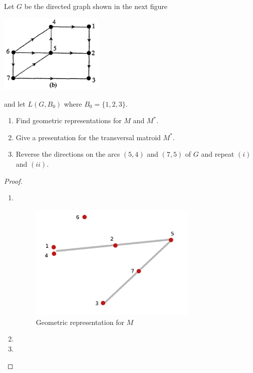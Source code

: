 \prob
{
    Let $G$ be the directed graph shown in the next figure 
		    \begin{center}
                \includegraphics[width=5cm]{Test2/Problem13/Figure2_17.png}
            \end{center}\pn
		and let $L(G, B_0)$ where $B_0 = \{1,2,3\}$. 
    \begin{enumerate}[label=(\roman*)]
        \item   Find geometric representations for $M$ and $M^*$.
        \item   Give a presentation for the transversal matroid $M^*$.
        \item   Reverse the directions on the arcs $(5,4)$ and $(7,5)$ of $G$
                and repeat $(i)$ and $(ii)$.
    \end{enumerate}
}
\begin{proof}
    \begin{enumerate}
        \item $\,$\pn
             \begin{figure}[H]
                \begin{center}
                    \includegraphics[width=8cm]{Test2/Problem13/GraphicRepresentationM.png}
                \end{center}                            
                \caption{Geometric representation for $M$}
                \label{t2:p13_GraphicRepresentationM.png}                        
            \end{figure}\pn    
        \item
        \item
    \end{enumerate}
\end{proof}